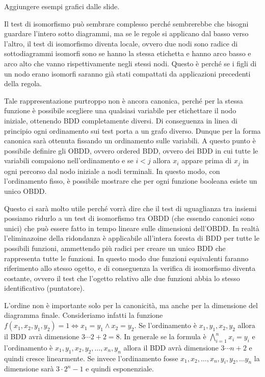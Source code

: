 Aggiungere esempi grafici dalle slide.

Il test di isomorfismo può sembrare complesso perché sembrerebbe che bisogni guardare l'intero sotto diagrammi, ma se le regole si applicano dal basso verso l'altro, il test di isomorfismo diventa locale, ovvero due nodi sono radice di sottodiagrammi isomorfi sono se hanno la stessa etichetta e hanno arco basso e arco alto che vanno rispettivamente negli stessi nodi. Questo è perché se i figli di un nodo erano isomorfi saranno già stati compattati da applicazioni precedenti della regola.

Tale rappresentazione purtroppo non è ancora canonica, perché per la stessa funzione è possibile scegliere una qualsiasi variabile per etichettare il nodo iniziale, ottenendo BDD completamente diversi. Di conseguenza in linea di principio ogni ordinamento sui test porta a un grafo diverso. Dunque per la forma canonica sarà ottenuta fissando un ordinamento sulle variabili.
A questo punto è possibile definire gli OBDD, ovvero ordered BDD, ovvero dei BDD in cui tutte le variabili compaiono nell'ordinamento e se \(i<j\) allora \(x_i\) appare prima di \(x_j\) in ogni percorso dal nodo iniziale a nodi terminali. In questo modo, con l'ordinamento fisso, è possibile mostrare che per ogni funzione booleana esiste un unico OBDD\@.

Questo ci sarà molto utile perché vorrà dire che il test di uguaglianza tra insiemi possiamo ridurlo a un test di isomorfismo tra OBDD (che essendo canonici sono unici) che può essere fatto in tempo lineare sulle dimensioni dell'OBDD\@. In realtà l'eliminazoine della ridondanza è applicabile all'intera foresta di BDD per tutte le possibili funzioni, ammettendo più radici per creare un unico BDD che rappresenta tutte le funzioni. In questo modo due funzioni equivalenti faranno riferimento allo stesso ogetto, e di conseguenza la verifica di isomorfismo diventa costante, ovvero il test che l'ogetto relativo alle due funzioni abbia lo stesso identificativo (puntatore).

L'ordine non è importante solo per la canonicità, ma anche per la dimensione del diagramma finale. Consideriamo infatti la funzione \(f(x_1,x_2,y_1,y_2) = 1 \iff x_1 = y_1 \land x_2 = y_2\). Se l'ordinamento è \(x_1,y_1,x_2,y_2\) allora il BDD avrà dimensione \(3 \cdots 2 +2  = 8\). In generale se la formula è \(\bigwedge_{i=1}^n x_i = y_i\) e l'ordinamento è \(x_1,y_1,x_2,y_2,\dots,x_n,y_n\) allora il BDD avrà dimensione \(3 \cdots n +2\) e quindi cresce linearmente. Se invece l'ordinamento fosse \(x_1,x_2,\ldots, x_n,y_i,y_2, \ldots y_n\) la dimensione sarà \(3\cdot 2^n-1\) e quindi esponenziale.

